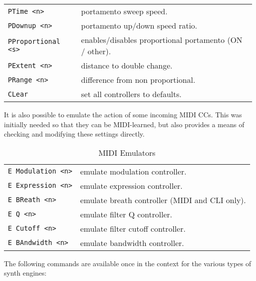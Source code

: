 \begin{table}[H]
\begin{tabular}{l l}
\texttt{PTime <n>} &
   portamento sweep speed. \\
\texttt{PDownup <n>} &
   portamento up/down speed ratio. \\
\texttt{PProportional <s>} &
   enables/disables proportional portamento (ON / other). \\
\texttt{PExtent <n>} &
   distance to double change. \\
\texttt{PRange <n>} &
   difference from non proportional. \\
\texttt{CLear} &
   set all controllers to defaults. \\
      \end{tabular}
   \end{table}

   It is also possible to emulate the action of some incoming MIDI CCs. This
   was initially needed so that they can be MIDI-learned, but also provides
   a means of checking and modifying these settings directly.

   \begin{table}[H]
      \centering
      \caption{MIDI Emulators}
      \label{table:yoshimi_part_midi_emulators}
      \begin{tabular}{l l}
\texttt{E Modulation <n>} &
   emulate modulation controller. \\
\texttt{E Expression <n>} &
   emulate expression controller. \\
\texttt{E BReath <n>} &
   emulate breath controller (MIDI and CLI only). \\
\texttt{E Q <n>} &
   emulate filter Q controller. \\
\texttt{E Cutoff <n>} &
   emulate filter cutoff controller. \\
\texttt{E BAndwidth <n>} &
   emulate bandwidth controller. \\
      \end{tabular}
   \end{table}

   The following commands are available once in the context for the various
   types of synth engines:


